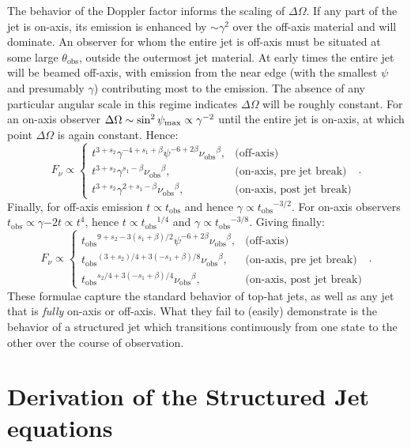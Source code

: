 \documentclass[modern]{aastex62}
\newcommand{\tobs}{\ensuremath{t_{\mathrm{obs}}}}
\newcommand{\nuobs}{\ensuremath{\nu_{\mathrm{obs}}}}
\newcommand{\thobs}{\ensuremath{\theta_{\mathrm{obs}}}}
\begin{document}
The behavior of the Doppler factor informs the scaling of $\Delta \Omega$.  If any part of the jet is on-axis, its emission is enhanced by $\sim \gamma^2$ over the off-axis material and will dominate.  An observer for whom the entire jet is off-axis must be situated at some large $\thobs$, outside the outermost jet material.  At early times the entire jet will be beamed off-axis, with emission from the near edge (with the smallest $\psi$ and presumably $\gamma$) contributing most to the emission.  The absence of any particular angular scale in this regime indicates $\Delta \Omega$ will be roughly constant.  For an on-axis observer $\Delta \Omega \sim \sin^2 \psi_{\rm{max}} \propto \gamma^{-2}$ until the entire jet is on-axis, at which point $\Delta \Omega$ is again constant.  Hence:
\begin{equation}
	F_\nu \propto \left \{ \begin{matrix}
				t^{3+s_2} \gamma^{-4+s_1+\beta} \psi^{-6+2\beta}\nuobs^\beta,  & \text{(off-axis)} \\
				t^{3+s_2} \gamma^{s_1-\beta} \nuobs^\beta, &  \text{(on-axis, pre jet break)} \\
				t^{3+s_2} \gamma^{2+s_1-\beta} \nuobs^\beta, & \text{(on-axis, post jet break)} \end{matrix} \right . \ .
\end{equation}
Finally, for off-axis emission $t \propto \tobs$ and hence $\gamma \propto \tobs^{-3/2}$.  For on-axis observers $\tobs \propto \gamma{-2} t \propto t^4$, hence $t\propto \tobs^{1/4}$ and $\gamma \propto \tobs^{-3/8}$. Giving finally:
\begin{equation}
	F_\nu \propto \left \{ \begin{matrix}
				\tobs^{9+s_2 -3(s_1+\beta)/2} \psi^{-6+2\beta}\nuobs^\beta,  & \text{(off-axis)} \\
				\tobs^{(3+s_2)/4+3(-s_1+\beta)/8} \nuobs^\beta, &\text{(on-axis, pre jet break)} \\
				\tobs^{s_2/4 + 3(-s_1+\beta)/4} \nuobs^\beta, & \text{(on-axis, post jet break)} \end{matrix} \right . \ .
\end{equation}
These formulae capture the standard behavior of top-hat jets, as well as any jet that is \emph{fully} on-axis or off-axis.  What they fail to (easily) demonstrate is the behavior of a structured jet which transitions continuously from one state to the other over the course of observation.

\section{Derivation of the Structured Jet equations}\label{sec:derive2}
\end{document}
